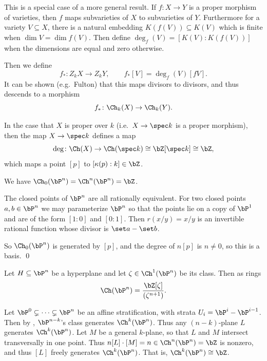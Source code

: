 \bnote

    This is a special case of a more general result.
    If $f\colon X\to Y$ is a proper morphism of varieties, then $f$ maps subvarieties of $X$ to subvarieties of $Y$.
    Furthermore for a variety $V\subseteq X$, there is a natural embedding $K(f(V))\subseteq K(V)$ which is finite when $\dim V=\dim f(V)$.
    Then define $\deg_f(V)=[K(V):K(f(V))]$ when the dimensions are equal and zero otherwise.

    Then we define
    $$ f_*\colon Z_kX \to Z_kY,\qquad f_*[V] = \deg_f(V)[fV] . $$
    It can be shown (e.g.\ Fulton) that this maps divisors to divisors, and thus descends to a morphism
    $$ f_*\colon\Ch_k(X) \to \Ch_k(Y) . $$

    In the case that $X$ is proper over $k$ (i.e.\ $X\to\spec k$ is a proper morphism), then the map $X\to\spec k$ defines a map
    $$ \deg\colon\Ch(X) \to \Ch(\spec k) \cong \bZ[\spec k] \cong \bZ , $$
    which maps a point $[p]$ to $[\kappa(p):k]\in\bZ$.

\enote

\blemm

    We have $\Ch_0(\bP^n)=\Ch^n(\bP^n)=\bZ$.

\elemm

\bproof

    The closed points of $\bP^n$ are all rationally equivalent.
    For two closed points $a,b\in\bP^n$ we may parameterize $\bP^n$ so that the points lie on a copy of $\bP^1$ and are of the form
    $[1:0]$ and $[0:1]$.
    Then $r(x/y)=x/y$ is an invertible rational function whose divisor is $\set a-\set b$.

    So $\Ch_0(\bP^n)$ is generated by $[p]$, and the degree of $n[p]$ is $n\neq0$, so this is a basis.
    \qed

\eproof

\bthrm[name={chowprojective}]

    Let $H\subseteq\bP^n$ be a hyperplane and let $\zeta\in\Ch^1(\bP^n)$ be its class.
    Then as rings
    $$ \Ch(\bP^n) = \frac{\bZ[\zeta]}{(\zeta^{n+1})} . $$

\ethrm

\bproof

    Let $\bP^0\subsetneq\cdots\subsetneq\bP^n$ be an affine stratification, with strata $U_i=\bP^i-\bP^{i-1}$.
    Then by , $\bP^{n-k}$'s class generates $\Ch^k(\bP^n)$.
    Thus any $(n-k)$-plane $L$ generates $\Ch^k(\bP^n)$.
    Let $M$ be a general $k$-plane, so that $L$ and $M$ intersect transversally in one point.
    Thus $n[L]\cdot[M]=n\in\Ch^n(\bP^n)=\bZ$ is nonzero, and thus $[L]$ freely generates $\Ch^k(\bP^n)$.
    That is, $\Ch^k(\bP^n)\cong\bZ$.

